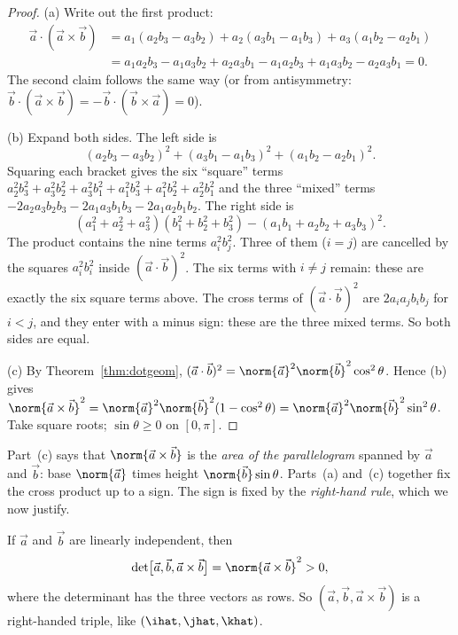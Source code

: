 \begin{proof}
(a) Write out the first product:
\begin{align*}
\vec a\cdot(\vec a\times\vec b)&=a_1(a_2b_3-a_3b_2)+a_2(a_3b_1-a_1b_3)+a_3(a_1b_2-a_2b_1)\\
&=a_1a_2b_3-a_1a_3b_2+a_2a_3b_1-a_1a_2b_3+a_1a_3b_2-a_2a_3b_1=0 .
\end{align*}
The second claim follows the same way (or from antisymmetry: $\vec b\cdot(\vec a\times\vec b)=-\vec b\cdot(\vec b\times\vec a)=0$).

(b) Expand both sides. The left side is
\[
(a_2b_3-a_3b_2)^2+(a_3b_1-a_1b_3)^2+(a_1b_2-a_2b_1)^2 .
\]
Squaring each bracket gives the six ``square'' terms $a_2^2b_3^2+a_3^2b_2^2+a_3^2b_1^2+a_1^2b_3^2+a_1^2b_2^2+a_2^2b_1^2$ and the three ``mixed'' terms $-2a_2a_3b_2b_3-2a_1a_3b_1b_3-2a_1a_2b_1b_2$. The right side is
\[
(a_1^2+a_2^2+a_3^2)(b_1^2+b_2^2+b_3^2)-(a_1b_1+a_2b_2+a_3b_3)^2 .
\]
The product contains the nine terms $a_i^2b_j^2$. Three of them ($i=j$) are cancelled by the squares $a_i^2b_i^2$ inside $(\vec a\cdot\vec b)^2$. The six terms with $i\neq j$ remain: these are exactly the six square terms above. The cross terms of $(\vec a\cdot\vec b)^2$ are $2a_ia_jb_ib_j$ for $i<j$, and they enter with a minus sign: these are the three mixed terms. So both sides are equal.

(c) By Theorem~\ref{thm:dotgeom}, $(\vec a\cdot\vec b)^2=\norm{\vec a}^2\norm{\vec b}^2\cos^2\theta$. Hence (b) gives $\norm{\vec a\times\vec b}^2=\norm{\vec a}^2\norm{\vec b}^2(1-\cos^2\theta)=\norm{\vec a}^2\norm{\vec b}^2\sin^2\theta$. Take square roots; $\sin\theta\ge0$ on $[0,\pi]$.
\end{proof}

Part~(c) says that $\norm{\vec a\times\vec b}$ is the \emph{area of the parallelogram} spanned by $\vec a$ and $\vec b$: base $\norm{\vec a}$ times height $\norm{\vec b}\sin\theta$. Parts~(a) and~(c) together fix the cross product up to a sign. The sign is fixed by the \emph{right-hand rule}, which we now justify.

\begin{proposition}\label{prop:righthand}
If $\vec a$ and $\vec b$ are linearly independent, then
\[
\det\bigl[\vec a,\vec b,\vec a\times\vec b\bigr]=\norm{\vec a\times\vec b}^2>0 ,
\]
where the determinant has the three vectors as rows. So $(\vec a,\vec b,\vec a\times\vec b)$ is a right-handed triple, like $(\ihat,\jhat,\khat)$.
\end{proposition}

